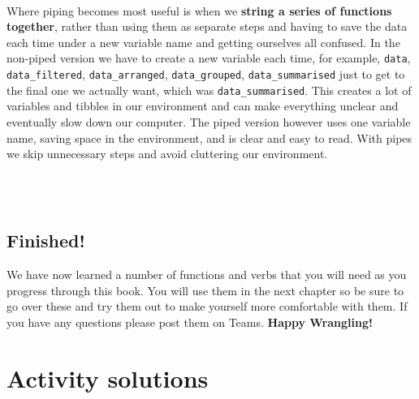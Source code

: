 \documentclass[]{book}
\newenvironment{Shaded}{\begin{snugshade}}{\end{snugshade}}
\newcommand{\CommentTok}[1]{\textcolor[rgb]{0.56,0.35,0.01}{\textit{#1}}}
\newcommand{\KeywordTok}[1]{\textcolor[rgb]{0.13,0.29,0.53}{\textbf{#1}}}
\newcommand{\NormalTok}[1]{#1}
\newcommand{\OperatorTok}[1]{\textcolor[rgb]{0.81,0.36,0.00}{\textbf{#1}}}
\newcommand{\StringTok}[1]{\textcolor[rgb]{0.31,0.60,0.02}{#1}}
\newenvironment{try}
    {
    \hline\\
    }
    { 
    \\\\\hline
    }
\begin{document}
\begin{Shaded}
\end{Shaded}

\begin{try}
Where piping becomes most useful is when we \textbf{string a series of
functions together}, rather than using them as separate steps and having
to save the data each time under a new variable name and getting
ourselves all confused. In the non-piped version we have to create a new
variable each time, for example, \texttt{data}, \texttt{data\_filtered},
\texttt{data\_arranged}, \texttt{data\_grouped},
\texttt{data\_summarised} just to get to the final one we actually want,
which was \texttt{data\_summarised}. This creates a lot of variables and
tibbles in our environment and can make everything unclear and
eventually slow down our computer. The piped version however uses one
variable name, saving space in the environment, and is clear and easy to
read. With pipes we skip unnecessary steps and avoid cluttering our
environment.
\end{try}

\hypertarget{finished-2}{%
\subsection{Finished!}\label{finished-2}}

We have now learned a number of functions and verbs that you will need as you progress through this book. You will use them in the next chapter so be sure to go over these and try them out to make yourself more comfortable with them. If you have any questions please post them on Teams. \textbf{Happy Wrangling!}

\hypertarget{activity-solutions}{%
\section{Activity solutions}\label{activity-solutions}}
\end{document}
